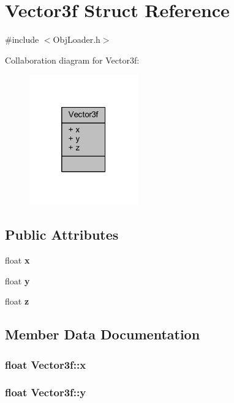 \section{Vector3f Struct Reference}
\label{struct_vector3f}


{\ttfamily \#include $<$Obj\+Loader.\+h$>$}



Collaboration diagram for Vector3f\+:\nopagebreak
\begin{figure}[H]
\begin{center}
\leavevmode
\includegraphics[width=133pt]{de/d8e/struct_vector3f__coll__graph}
\end{center}
\end{figure}
\subsection*{Public Attributes}
\begin{DoxyCompactItemize}
\item 
float {\bf x}
\item 
float {\bf y}
\item 
float {\bf z}
\end{DoxyCompactItemize}


\subsection{Member Data Documentation}
\subsubsection[{x}]{\setlength{\rightskip}{0pt plus 5cm}float Vector3f\+::x}\label{struct_vector3f_a4aca0751716b7099b397e8c63b16bfcf}
\subsubsection[{y}]{\setlength{\rightskip}{0pt plus 5cm}float Vector3f\+::y}\label{struct_vector3f_a8a602e2ee75126feb520c2aa27e7eff5}
